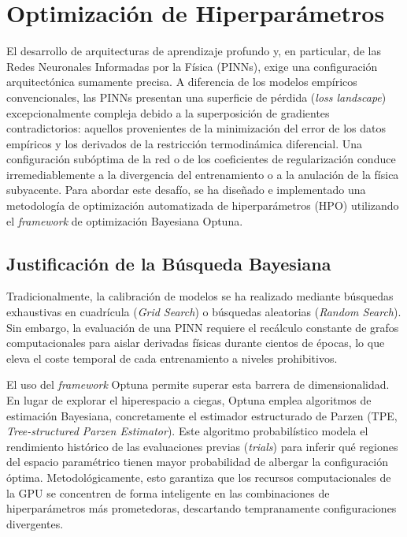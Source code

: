 \documentclass[a4paper, 12pt, twocolumn]{book}
\begin{document}
\section{Optimización de Hiperparámetros}

El desarrollo de arquitecturas de aprendizaje profundo y, en particular, de las Redes Neuronales Informadas por la Física (PINNs), exige una configuración arquitectónica sumamente precisa. A diferencia de los modelos empíricos convencionales, las PINNs presentan una superficie de pérdida (\textit{loss landscape}) excepcionalmente compleja debido a la superposición de gradientes contradictorios: aquellos provenientes de la minimización del error de los datos empíricos y los derivados de la restricción termodinámica diferencial. Una configuración subóptima de la red o de los coeficientes de regularización conduce irremediablemente a la divergencia del entrenamiento o a la anulación de la física subyacente. Para abordar este desafío, se ha diseñado e implementado una metodología de optimización automatizada de hiperparámetros (HPO) utilizando el \textit{framework} de optimización Bayesiana Optuna.

\subsection{Justificación de la Búsqueda Bayesiana}

Tradicionalmente, la calibración de modelos se ha realizado mediante búsquedas exhaustivas en cuadrícula (\textit{Grid Search}) o búsquedas aleatorias (\textit{Random Search}). Sin embargo, la evaluación de una PINN requiere el recálculo constante de grafos computacionales para aislar derivadas físicas durante cientos de épocas, lo que eleva el coste temporal de cada entrenamiento a niveles prohibitivos. 

El uso del \textit{framework} Optuna permite superar esta barrera de dimensionalidad. En lugar de explorar el hiperespacio a ciegas, Optuna emplea algoritmos de estimación Bayesiana, concretamente el estimador estructurado de Parzen (TPE, \textit{Tree-structured Parzen Estimator}). Este algoritmo probabilístico modela el rendimiento histórico de las evaluaciones previas (\textit{trials}) para inferir qué regiones del espacio paramétrico tienen mayor probabilidad de albergar la configuración óptima. Metodológicamente, esto garantiza que los recursos computacionales de la GPU se concentren de forma inteligente en las combinaciones de hiperparámetros más prometedoras, descartando tempranamente configuraciones divergentes.
\end{document}
